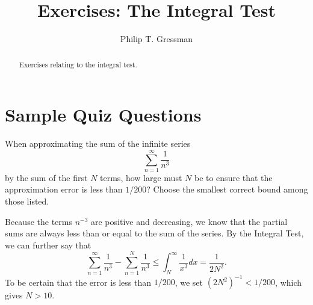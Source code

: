 \documentclass{ximera}
\title{Exercises: The Integral Test}
\author{Philip T. Gressman}
\begin{document}
\begin{abstract}
Exercises relating to the integral test.
\end{abstract}
\maketitle

\section*{Sample Quiz Questions}

\begin{question}%

When approximating the sum of the infinite series
\[ \sum_{n=1}^\infty \frac{1}{n^3} \]
by the sum of the first \(N\) terms, how large must \(N\) be to ensure that the approximation error is less than \(1/200\)? Choose the smallest correct bound among those listed.
\begin{multiplechoice}
\end{multiplechoice}
\begin{feedback}
Because the terms \(n^{-3}\) are positive and decreasing, we know that the partial sums are always less than or equal to the sum of the series. By the Integral Test, we can further say that
\[ \sum_{n=1}^\infty \frac{1}{n^3} - \sum_{n=1}^N \frac{1}{n^3} \leq \int_N^\infty \frac{1}{x^3} dx  = \frac{1}{2N^2}.\]
To be certain that the error is less than \(1/200\), we set \((2 N^2)^{-1} < 1/200\), which gives \(N > 10\).
\end{feedback}

\end{question}
\end{document}
